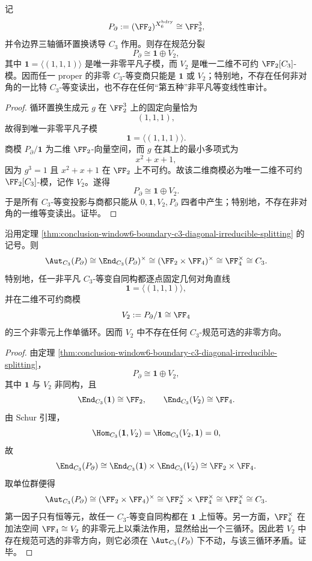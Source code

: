 \begin{theorem}\label{thm:conclusion-window6-boundary-c3-diagonal-irreducible-splitting}
记
\[
P_{\partial}:=(\FF_2)^{X_6^{\mathrm{bdry}}}\cong \FF_2^3,
\]
并令边界三轴循环置换诱导 \(C_3\) 作用。则存在规范分裂
\[
P_{\partial}\cong \mathbf 1\oplus V_2,
\]
其中 \(\mathbf 1=\langle(1,1,1)\rangle\) 是唯一非零平凡子模，而 \(V_2\) 是唯一二维不可约 \(\FF_2[C_3]\)-模。因而任一 proper 的非零 \(C_3\)-等变商只能是 \(\mathbf 1\) 或 \(V_2\)；特别地，不存在任何非对角的一比特 \(C_3\)-等变读出，也不存在任何“第五种”非平凡等变线性审计。
\end{theorem}
\begin{proof}
循环置换生成元 \(g\) 在 \(\FF_2^3\) 上的固定向量恰为
\[
(1,1,1),
\]
故得到唯一非零平凡子模
\[
\mathbf 1=\langle(1,1,1)\rangle.
\]
商模 \(P_{\partial}/\mathbf 1\) 为二维 \(\FF_2\)-向量空间，而 \(g\) 在其上的最小多项式为
\[
x^2+x+1,
\]
因为 \(g^3=1\) 且 \(x^2+x+1\) 在 \(\FF_2\) 上不可约。故该二维商模必为唯一二维不可约 \(\FF_2[C_3]\)-模，记作 \(V_2\)。遂得
\[
P_{\partial}\cong \mathbf 1\oplus V_2.
\]
于是所有 \(C_3\)-等变投影与商都只能从 \(0,\mathbf 1,V_2,P_{\partial}\) 四者中产生；特别地，不存在非对角的一维等变读出。证毕。
\end{proof}

\begin{theorem}\label{thm:conclusion-window6-boundary-c3-automorphism-rigidity}
沿用定理 \ref{thm:conclusion-window6-boundary-c3-diagonal-irreducible-splitting} 的记号。则
\[
\Aut_{C_3}(P_{\partial})
\cong
\End_{C_3}(P_{\partial})^\times
\cong
(\FF_2\times \FF_4)^\times
\cong
\FF_4^\times
\cong
C_3.
\]
特别地，任一非平凡 \(C_3\)-等变自同构都逐点固定几何对角直线
\[
\mathbf 1=\langle(1,1,1)\rangle,
\]
并在二维不可约商模
\[
V_2:=P_{\partial}/\mathbf 1\cong \FF_4
\]
的三个非零元上作单循环。因而 \(V_2\) 中不存在任何 \(C_3\)-规范可选的非零方向。
\end{theorem}
\begin{proof}
由定理 \ref{thm:conclusion-window6-boundary-c3-diagonal-irreducible-splitting}，
\[
P_{\partial}\cong \mathbf 1\oplus V_2,
\]
其中 \(\mathbf 1\) 与 \(V_2\) 非同构，且
\[
\End_{C_3}(\mathbf 1)\cong \FF_2,
\qquad
\End_{C_3}(V_2)\cong \FF_4.
\]
由 Schur 引理，
\[
\Hom_{C_3}(\mathbf 1,V_2)=\Hom_{C_3}(V_2,\mathbf 1)=0,
\]
故
\[
\End_{C_3}(P_{\partial})
\cong
\End_{C_3}(\mathbf 1)\times \End_{C_3}(V_2)
\cong
\FF_2\times \FF_4.
\]
取单位群便得
\[
\Aut_{C_3}(P_{\partial})
\cong
(\FF_2\times \FF_4)^\times
\cong
\FF_2^\times\times \FF_4^\times
\cong
\FF_4^\times
\cong
C_3.
\]
第一因子只有恒等元，故任一 \(C_3\)-等变自同构都在 \(\mathbf 1\) 上恒等。另一方面，\(\FF_4^\times\) 在加法空间 \(\FF_4\cong V_2\) 的非零元上以乘法作用，显然给出一个三循环。因此若 \(V_2\) 中存在规范可选的非零方向，则它必须在 \(\Aut_{C_3}(P_{\partial})\) 下不动，与该三循环矛盾。证毕。
\end{proof}

